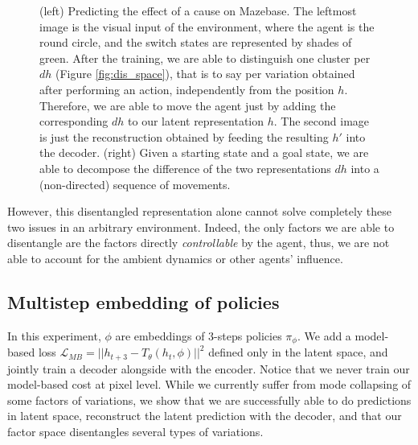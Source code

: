 \begin{figure}[t]
\centering
\begin{subfigure}{.45\textwidth}
\centering
{}
\end{subfigure}
\begin{subfigure}{.45\textwidth}
\centering
{} %
\end{subfigure}
\caption{(left) Predicting the effect of a cause on Mazebase. The leftmost image is the visual input of the environment, where the agent is the round circle, and the switch states are represented by shades of green. After the training, we are able to distinguish one cluster per $dh$ (Figure \ref{fig:dis_space}), that is to say per variation obtained after performing an action, independently from the position $h$. Therefore, we are able to move the agent just by adding the corresponding $dh$ to our latent representation $h$. The second image is just the reconstruction obtained by feeding the resulting $h'$ into the decoder. (right) Given a starting state and a goal state, we are able to decompose the difference of the two representations $dh$ into a (non-directed) sequence of movements.}
\label{fig:prediction_recovering}
\end{figure}


However, this disentangled representation alone cannot solve completely these two issues in an arbitrary environment. Indeed, the only factors we are able to disentangle are the factors directly \textit{controllable} by the agent, thus, we are not able to account for the ambient dynamics or other agents' influence.



\subsection{Multistep embedding of policies}
In this experiment, $\phi$ are embeddings of $3$-steps policies $\pi_\phi$. We add a model-based loss $\mathcal{L}_{MB}=||h_{t+3} - T_\theta(h_t, \phi)||^2$ defined only in the latent space, and jointly train a decoder alongside with the encoder. Notice that we never train our model-based cost at pixel level.
While we currently suffer from mode collapsing of some factors of variations, we show that we are successfully able to do predictions in latent space, reconstruct the latent prediction with the decoder, and that our factor space disentangles several types of variations.

